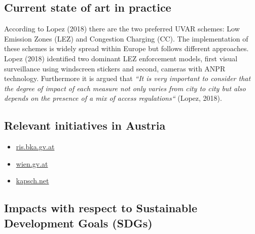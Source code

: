 \documentclass[
]{book}
\providecommand{\tightlist}{%
  \setlength{\itemsep}{0pt}\setlength{\parskip}{0pt}}
\begin{document}
\hypertarget{current-state-of-art-in-practice-7}{%
\subsection*{Current state of art in practice}\label{current-state-of-art-in-practice-7}}

According to Lopez (2018) there are the two preferred UVAR schemes: Low Emission Zones (LEZ) and Congestion Charging (CC). The implementation of these schemes is widely spread within Europe but follows different approaches. Lopez (2018) identified two dominant LEZ enforcement models, first visual surveillance using windscreen stickers and second, cameras with ANPR technology. Furthermore it is argued that \emph{``It is very important to consider that the degree of impact of each measure not only varies from city to city but also depends on the presence of a mix of access regulations``} (Lopez, 2018).

\hypertarget{relevant-initiatives-in-austria-7}{%
\subsection*{Relevant initiatives in Austria}\label{relevant-initiatives-in-austria-7}}

\begin{itemize}
\tightlist
\item
  \href{https://www.ris.bka.gv.at/GeltendeFassung.wxe?Abfrage=LrW\&Gesetzesnummer=20000270}{ris.bka.gv.at}
\item
  \href{https://www.wien.gv.at/ma22-lgb/luftgi.htm}{wien.gv.at}
\item
  \href{https://www.kapsch.net/ktc/its-solutions/urban-access-management/access-restriction/}{kapsch.net}
\end{itemize}

\hypertarget{impacts-with-respect-to-sustainable-development-goals-sdgs-7}{%
\subsection*{Impacts with respect to Sustainable Development Goals (SDGs)}\label{impacts-with-respect-to-sustainable-development-goals-sdgs-7}}
\end{document}
